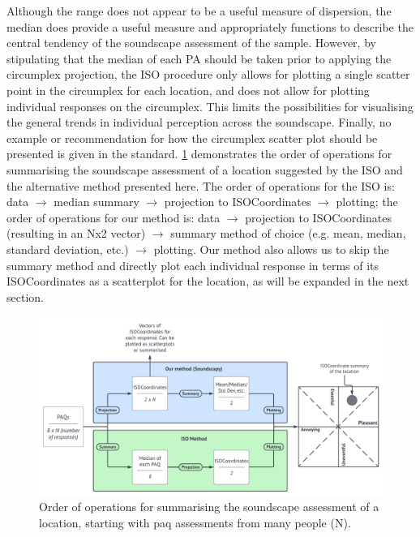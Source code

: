Although the range does not appear to be a useful measure of dispersion, the median does provide a useful measure and appropriately functions to describe the central tendency of the  soundscape assessment of the sample. However, by stipulating that the median of each PA should be taken prior to applying the circumplex projection, the ISO procedure only allows for plotting a single scatter point in the circumplex for each location, and does not allow for plotting individual responses on the circumplex. This limits the possibilities for visualising the general trends in individual perception across the soundscape. Finally, no example or recommendation for how the circumplex scatter plot should be presented is given in the standard. \cref{fig:summaryMethods} demonstrates the order of operations for summarising the soundscape assessment of a location suggested by the ISO and the alternative method presented here. The order of operations for the ISO is: data $\rightarrow$ median summary $\rightarrow$ projection to ISOCoordinates $\rightarrow$ plotting; the order of operations for our method is: data $\rightarrow$ projection to ISOCoordinates (resulting in an Nx2 vector) $\rightarrow$ summary method of choice (e.g. mean, median, standard deviation, etc.) $\rightarrow$ plotting. Our method also allows us to skip the summary method and directly plot each individual response in terms of its ISOCoordinates as a scatterplot for the location, as will be expanded in the next section.

\begin{figure}
  \centering
  \includegraphics{Figures/SummaryMethodDiagram.png}
  \caption[]{Order of operations for summarising the soundscape assessment of a location, starting with \gls{paq} assessments from many people (N). \label{fig:summaryMethods}}
\end{figure}

